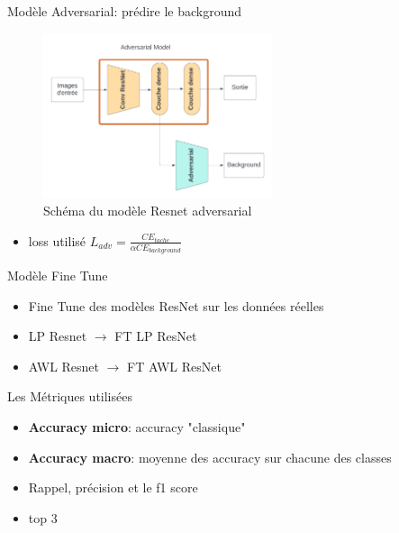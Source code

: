\documentclass[11pt]{beamer}
\begin{document}
\begin{frame}{Modèle Adversarial: prédire le background}
    \begin{figure}
        \centering
        \includegraphics[width=0.6\textwidth]{../asset/Resnet_adv.png}
        \caption{Schéma du modèle Resnet adversarial}
        \label{fig:resnet_adv}
    \end{figure}
    \begin{itemize}
        \item loss utilisé $L_{adv} = \frac{CE_{tache}}{\alpha CE_{background}}$
    \end{itemize}
\end{frame}

\begin{frame}{Modèle Fine Tune}
    \begin{itemize}
        \item Fine Tune des modèles ResNet sur les données réelles
        \item LP Resnet $\rightarrow$ FT LP ResNet
        \item AWL Resnet $\rightarrow$ FT AWL ResNet
    \end{itemize}
\end{frame}

\begin{frame}{Les Métriques utilisées}
    \begin{itemize}
        \item \textbf{Accuracy micro}: accuracy "classique"
        \item \textbf{Accuracy macro}: moyenne des accuracy sur chacune des classes
        \item Rappel, précision et le f1 score
        \item top 3
    \end{itemize}
\end{frame}
\end{document}
